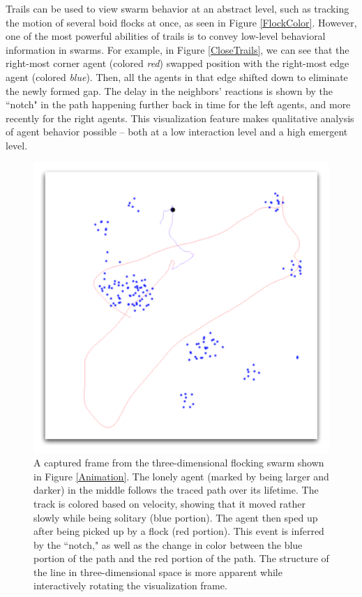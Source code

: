 \documentclass{vgtc}
\begin{document}
Trails can be used to view swarm behavior at an abstract level, such as tracking the motion of several boid
flocks at once, as seen in Figure \ref{FlockColor}.
However, one of the most powerful abilities of trails is to convey low-level behavioral information in swarms.
For example, in Figure \ref{CloseTrails}, we can see that the right-most corner agent (colored \textit{red})
swapped position with the right-most edge agent (colored \textit{blue}).
Then, all the agents in that edge shifted down to eliminate the newly formed gap.
The delay in the neighbors' reactions is shown by the ``notch" in the path happening
further back in time for the left agents, and more recently for the right agents.
This visualization feature makes qualitative analysis of agent behavior possible -- both at a low interaction level
and a high emergent level.







\begin{figure}
\centering
\includegraphics[scale=.4]{images/track.pdf}
\caption{
A captured frame from the three-dimensional flocking swarm shown in Figure \ref{Animation}.
The lonely agent (marked by being larger and darker) in the middle follows the traced path over its lifetime.
The track is colored based on velocity, showing that it moved rather slowly while being solitary (blue portion).
The agent then sped up after being picked up by a flock (red portion).
This event is inferred by the ``notch," as well as the change in color between the blue portion of the  path and the red portion of the path.
The structure of the line in three-dimensional space is more apparent while interactively rotating the visualization frame.}
\label{Track}
\end{figure}
\end{document}
